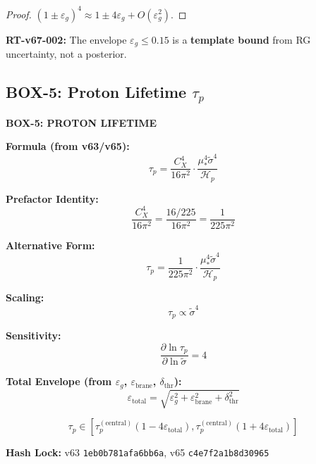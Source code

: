 \documentclass[11pt,letterpaper]{article}
\newcommand{\st}{\tilde{\sigma}}
\newcommand{\eps}{\varepsilon}
\newcommand{\Hp}{\mathcal{H}_p}
\begin{document}
\begin{proof}
$(1 \pm \eps_g)^4 \approx 1 \pm 4\eps_g + O(\eps_g^2)$.
\end{proof}

\begin{reviewertrap}
\textbf{RT-v67-002:} The envelope $\eps_g \leq 0.15$ is a \textbf{template bound} from RG uncertainty, not a posterior.
\end{reviewertrap}

\subsection{BOX-5: Proton Lifetime $\tau_p$}
\label{subsec:box5}

\begin{closurebox}
\textbf{BOX-5: PROTON LIFETIME}

\textbf{Formula (from v63/v65):}
\begin{equation}
\boxed{
\tau_p = \frac{C_X^4}{16\pi^2} \cdot \frac{\mu_*^4 \st^4}{\Hp}
}
\label{eq:box5-taup}
\end{equation}

\textbf{Prefactor Identity:}
\begin{equation}
\frac{C_X^4}{16\pi^2} = \frac{16/225}{16\pi^2} = \frac{1}{225\pi^2}
\label{eq:prefactor-identity}
\end{equation}

\textbf{Alternative Form:}
\begin{equation}
\tau_p = \frac{1}{225\pi^2} \cdot \frac{\mu_*^4 \st^4}{\Hp}
\label{eq:taup-alt}
\end{equation}

\textbf{Scaling:}
\begin{equation}
\tau_p \propto \st^4
\label{eq:taup-scaling}
\end{equation}

\textbf{Sensitivity:}
\begin{equation}
\frac{\partial \ln \tau_p}{\partial \ln \st} = 4
\label{eq:taup-sensitivity}
\end{equation}

\textbf{Total Envelope (from $\eps_g$, $\eps_{\text{brane}}$, $\delta_{\text{thr}}$):}
\begin{equation}
\eps_{\text{total}} = \sqrt{\eps_g^2 + \eps_{\text{brane}}^2 + \delta_{\text{thr}}^2}
\label{eq:eps-total}
\end{equation}

\begin{equation}
\tau_p \in \left[ \tau_p^{(\text{central})} (1 - 4\eps_{\text{total}}), \tau_p^{(\text{central})} (1 + 4\eps_{\text{total}}) \right]
\label{eq:taup-interval}
\end{equation}

\textbf{Hash Lock:} v63 \texttt{1eb0b781afa6bb6a}, v65 \texttt{c4e7f2a1b8d30965}
\end{closurebox}
\end{document}

